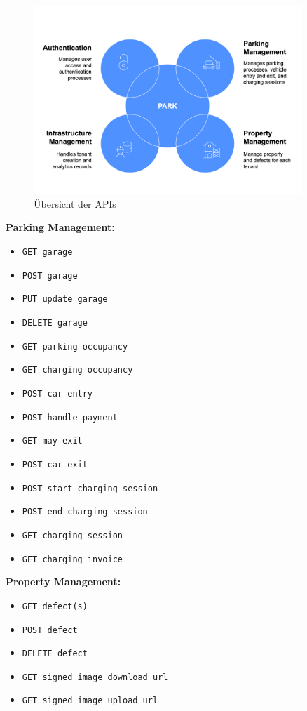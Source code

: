 \begin{figure}[ht]
    \centering
    \includegraphics[width=0.9\textwidth]{resources/api-overview-blue.png}
    \caption{Übersicht der APIs}
    \label{fig:api-overview}
\end{figure}

\textbf{Parking Management:}
\begin{itemize}[noitemsep]
    \item[] \verb|GET garage|
    \item[] \verb|POST garage|
    \item[] \verb|PUT update garage|
    \item[] \verb|DELETE garage|
    \item[] \verb|GET parking occupancy|
    \item[] \verb|GET charging occupancy|
    \item[] \verb|POST car entry|
    \item[] \verb|POST handle payment|
    \item[] \verb|GET may exit|
    \item[] \verb|POST car exit|
    \item[] \verb|POST start charging session|
    \item[] \verb|POST end charging session|
    \item[] \verb|GET charging session|
    \item[] \verb|GET charging invoice|
\end{itemize}

\textbf{Property Management:}
\begin{itemize}[noitemsep]
    \item[] \verb|GET defect(s)|
    \item[] \verb|POST defect|
    \item[] \verb|DELETE defect|
    \item[] \verb|GET signed image download url|
    \item[] \verb|GET signed image upload url|
\end{itemize}

